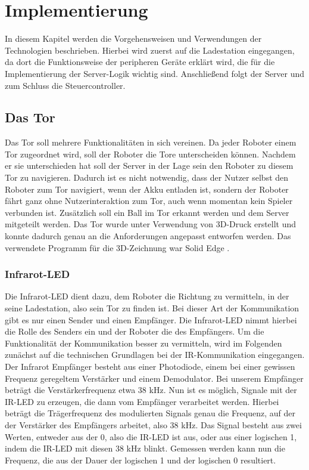 \chapter{Implementierung}
\label{ch:implementierung}

In diesem Kapitel werden die Vorgehensweisen und Verwendungen der Technologien beschrieben. Hierbei wird zuerst auf die Ladestation eingegangen, da dort die Funktionsweise der peripheren Geräte erklärt wird, die für die Implementierung der Server-Logik wichtig sind. Anschließend folgt der Server und zum Schluss die Steuercontroller.


\section{Das Tor}
Das Tor soll mehrere Funktionalitäten in sich vereinen. Da jeder Roboter einem Tor zugeordnet wird, soll der Roboter die Tore unterscheiden können. Nachdem er sie unterschieden hat soll der Server in der Lage sein den Roboter zu diesem Tor zu navigieren. Dadurch ist es nicht notwendig, dass der Nutzer selbst den Roboter zum Tor navigiert, wenn der Akku entladen ist, sondern der Roboter fährt ganz ohne Nutzerinteraktion zum Tor, auch wenn momentan kein Spieler verbunden ist. Zusätzlich soll ein Ball im Tor erkannt werden und dem Server mitgeteilt werden. Das Tor wurde unter Verwendung von 3D-Druck erstellt und konnte dadurch genau an die Anforderungen angepasst entworfen werden. Das verwendete Programm für die 3D-Zeichnung war Solid Edge \cite{SOLIDEDGE}.


\subsection{Infrarot-LED}
\label{sec:infrarot_led}
Die Infrarot-LED dient dazu, dem Roboter die Richtung zu vermitteln, in der seine Ladestation, also sein Tor zu finden ist. Bei dieser Art der Kommunikation gibt es nur einen Sender und einen Empfänger. Die Infrarot-LED nimmt hierbei die Rolle des Senders ein und der Roboter die des Empfängers. 
Um die Funktionalität der Kommunikation besser zu vermitteln, wird im Folgenden zunächst auf die technischen Grundlagen bei der IR-Kommunikation eingegangen.
Der Infrarot Empfänger besteht aus einer Photodiode, einem bei einer gewissen Frequenz geregeltem Verstärker und einem Demodulator. Bei unserem Empfänger beträgt die Verstärkerfrequenz etwa 38 kHz. Nun ist es möglich, Signale mit der IR-LED zu erzeugen, die dann vom Empfänger verarbeitet werden. Hierbei beträgt die Trägerfrequenz des modulierten Signals genau die Frequenz, auf der der Verstärker des Empfängers arbeitet, also 38 kHz. Das Signal besteht aus zwei Werten, entweder aus der 0, also die IR-LED ist aus, oder aus einer logischen 1, indem die IR-LED mit diesen 38 kHz blinkt. Gemessen werden kann nun die Frequenz, die aus der Dauer der logischen 1 und der logischen 0 resultiert. 

